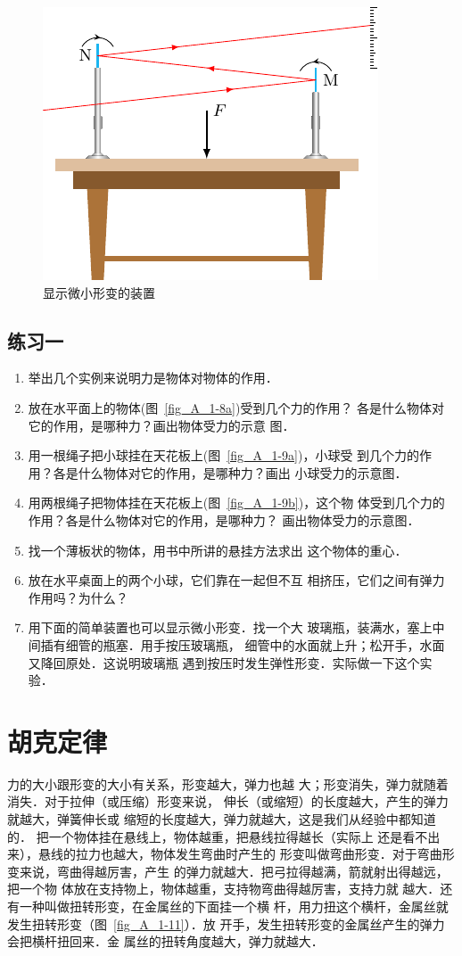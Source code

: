 \begin{figure} [htp]
\centering
\includegraphics{fig/A/1-10.pdf} 
\caption{显示微小形变的装置} \label{fig_A_1-10} 
\end{figure} 

\subsection*{练习一} 
\begin{enumerate} 
\item  举出几个实例来说明力是物体对物体的作用．
\item 放在水平面上的物体(图~\ref{fig_A_1-8a})受到几个力的作用？
  各是什么物体对它的作用，是哪种力？画出物体受力的示意
  图．
\item 用一根绳子把小球挂在天花板上(图~\ref{fig_A_1-9a})，小球受
  到几个力的作用？各是什么物体对它的作用，是哪种力？画出
  小球受力的示意图．
\item 用两根绳子把物体挂在天花板上(图~\ref{fig_A_1-9b})，这个物
  体受到几个力的作用？各是什么物体对它的作用，是哪种力？
  画出物体受力的示意图．
 \item 找一个薄板状的物体，用书中所讲的悬挂方法求出
  这个物体的重心．
 \item 放在水平桌面上的两个小球，它们靠在一起但不互
相挤压，它们之间有弹力作用吗？为什么？
\item 用下面的简单装置也可以显示微小形变．找一个大
玻璃瓶，装满水，塞上中间插有细管的瓶塞．用手按压玻璃瓶，
细管中的水面就上升；松开手，水面又降回原处．这说明玻璃瓶
遇到按压时发生弹性形变．实际做一下这个实验．
\end{enumerate} 

\section{胡克定律} 
力的大小跟形变的大小有关系，形变越大，弹力也越
大；形变消失，弹力就随着消失．对于拉伸（或压缩）形变来说，
伸长（或缩短）的长度越大，产生的弹力就越大，弹簧伸长或
缩短的长度越大，弹力就越大，这是我们从经验中都知道的．
把一个物体挂在悬线上，物体越重，把悬线拉得越长（实际上
还是看不出来），悬线的拉力也越大，物体发生弯曲时产生的
形变叫做弯曲形变．对于弯曲形变来说，弯曲得越厉害，产生
的弹力就越大．把弓拉得越满，箭就射出得越远，把一个物
体放在支持物上，物体越重，支持物弯曲得越厉害，支持力就
越大．还有一种叫做扭转形变，在金属丝的下面挂一个横
杆，用力扭这个横杆，金属丝就发生扭转形变（图~\ref{fig_A_1-11}）．放
开手，发生扭转形变的金属丝产生的弹力会把横杆扭回来．金
属丝的扭转角度越大，弹力就越大．

